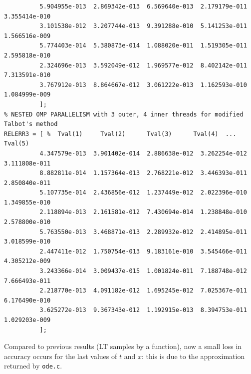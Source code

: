 \documentclass[a4paper,10pt]{report}%
\begin{document}
\begin{lstlisting}
          5.904955e-013  2.869342e-013  6.569640e-013  2.179179e-011  3.355414e-010
          3.101538e-012  3.207744e-013  9.391288e-010  5.141253e-011  1.566516e-009
          5.774403e-014  5.380873e-014  1.088020e-011  1.519305e-011  2.595818e-010
          2.324696e-013  3.592049e-012  1.969577e-012  8.402142e-011  7.313591e-010
          3.767912e-013  8.864667e-012  3.061222e-013  1.162593e-010  1.084999e-009
          ];
% NESTED OMP PARALLELISM with 3 outer, 4 inner threads for modified Talbot's method
RELERR3 = [ %  Tval(1)     Tval(2)      Tval(3)      Tval(4)  ... Tval(5)
          4.347579e-013  3.901402e-014  2.886638e-012  3.262254e-012  3.111808e-011
          8.882811e-014  1.157364e-013  2.768221e-012  3.446393e-011  2.850840e-011
          5.107735e-014  2.436856e-012  1.237449e-012  2.022396e-010  1.349855e-010
          2.118894e-013  2.161581e-012  7.430694e-014  1.238848e-010  2.578800e-010
          5.763550e-013  3.468871e-013  2.289932e-012  2.414895e-011  3.018599e-010
          2.447411e-012  1.750754e-013  9.183161e-010  3.545466e-011  4.305212e-009
          3.243366e-014  3.009437e-015  1.001824e-011  7.188748e-012  7.666493e-011
          2.218770e-013  4.091182e-012  1.695245e-012  7.025367e-011  6.176490e-010
          3.625272e-013  9.367343e-012  1.192915e-013  8.394753e-011  1.029203e-009
          ];
\end{lstlisting}
Compared to previous results (LT samples by a function), now a small loss in accuracy occurs for the last
values of $t$ and $x$: this is due to the approximation returned by {\tt ode.c}.
\end{document}
